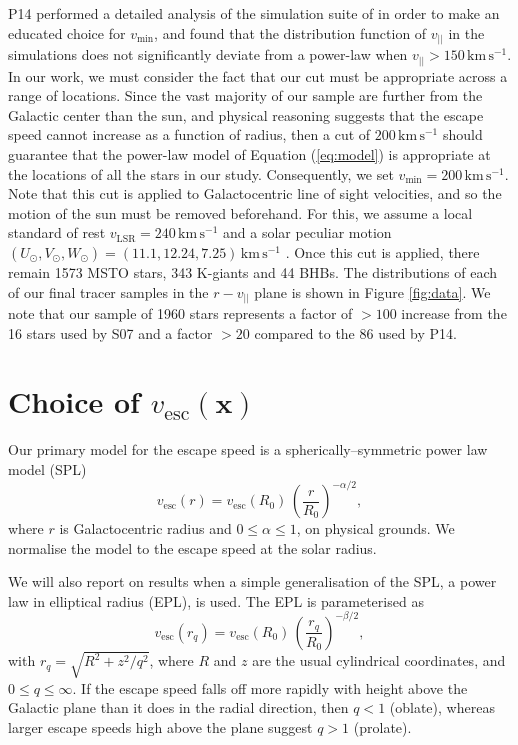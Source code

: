 \documentclass[useAMS,twocolumn,usenatbib]{mn2e}
\def\kms{{\,\mathrm{km\,s^{-1}}}}
\def\vlos{{v_{||}}}
\def\vesc{{v_\mathrm{esc}}}
\def\pos{{\boldsymbol{x}}}
\begin{document}
P14 performed a detailed analysis of the simulation suite of \citet{Sc09} in order to make an educated choice for $v_\mathrm{min}$, and found that the distribution function of $\vlos$ in the simulations does not significantly deviate from a power-law when $\vlos>150\kms$. 
In our work, we must consider the fact that our cut must be appropriate across a range of locations. 
Since the vast majority of our sample are further from the Galactic center than the sun, and physical reasoning suggests that the escape speed cannot increase as a function of radius, then a cut of $200\kms$ should guarantee that the power-law model of Equation (\ref{eq:model}) is appropriate at the locations of all the stars in our study. 
Consequently, we set $v_\mathrm{min}=200\kms$.  
Note that this cut is applied to Galactocentric line of sight velocities, and so the motion of the sun must be removed beforehand. 
For this, we assume a local standard of rest $v_\mathrm{LSR} = 240\kms$ and a solar peculiar motion $\left(U_\odot,V_\odot,W_\odot\right) = \left(11.1,12.24,7.25\right)\kms$ \citep{Sc10}.
Once this cut is applied, there remain 1573 MSTO stars, 343 K-giants and 44 BHBs. 
The distributions of each of our final tracer samples in the $r-\vlos$ plane is shown in Figure \ref{fig:data}. 
We note that our sample of 1960 stars represents a factor of $>100$ increase from the 16 stars used by S07 and a factor $>20$ compared to the 86 used by P14.

\section{Choice of $\vesc(\pos)$}

\label{sec:pot}

Our primary model for the escape speed is a spherically--symmetric power law model (SPL)
%
\begin{equation}
\vesc(r) = \vesc(R_0)\,\left(\dfrac{r}{R_0}\right)^{-\alpha/2},
\end{equation}
%
where $r$ is Galactocentric radius and $0 \leq \alpha \leq 1$, on physical grounds.  
We normalise the model to the escape speed at the solar radius. 

We will also report on results when a simple generalisation of the SPL, a power law in elliptical radius (EPL), is used.
The EPL is parameterised as
%
\begin{equation}
\vesc(r_q) = \vesc(R_0)\,\left(\dfrac{r_q}{R_0}\right)^{-\beta/2},
\end{equation}
%
with $r_q = \sqrt{R^2 + z^2/q^2}$, where $R$ and $z$ are the usual cylindrical coordinates, and $0 \leq q \leq \infty$. 
If the escape speed falls off more rapidly with height above the Galactic plane than it does in the radial direction, then $q<1$ (oblate), whereas larger escape speeds high above the plane suggest $q>1$ (prolate).
\end{document}
